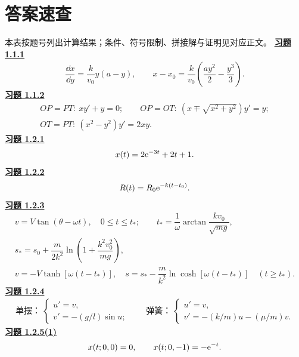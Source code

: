 \section{答案速查}
\noindent 本表按题号列出计算结果；条件、符号限制、拼接解与证明见对应正文。
\begingroup\small
\noindent\textbf{\hyperref[q:1.1.1]{习题 1.1.1}}
\[\begin{gathered}\dfrac{\dd x}{\dd y}=\dfrac{k}{v_0}y(a-y),\qquad
x-x_0=\dfrac{k}{v_0}\left(\dfrac{ay^2}{2}-\dfrac{y^3}{3}\right).\end{gathered}\]
\noindent\textbf{\hyperref[q:1.1.2]{习题 1.1.2}}
\[\begin{gathered}OP=PT:\ xy'+y=0;\qquad OP=OT:\ (x\mp\sqrt{x^2+y^2})y'=y;\\
OT=PT:\ (x^2-y^2)y'=2xy.\end{gathered}\]
\noindent\textbf{\hyperref[q:1.2.1]{习题 1.2.1}}
\[\begin{gathered}x(t)=2\mathrm e^{-3t}+2t+1.\end{gathered}\]
\noindent\textbf{\hyperref[q:1.2.2]{习题 1.2.2}}
\[\begin{gathered}R(t)=R_0\mathrm e^{-k(t-t_0)}.\end{gathered}\]
\noindent\textbf{\hyperref[q:1.2.3]{习题 1.2.3}}
\[\begin{gathered}v=V\tan(\theta-\omega t),\quad 0\le t\le t_*;\qquad t_*=\dfrac1\omega\arctan\dfrac{kv_0}{\sqrt{mg}},\\
s_*=s_0+\dfrac m{2k^2}\ln\left(1+\dfrac{k^2v_0^2}{mg}\right),\\
v=-V\tanh[\omega(t-t_*)],\quad
s=s_*-\dfrac m{k^2}\ln\cosh[\omega(t-t_*)]\quad(t\ge t_*).\end{gathered}\]
\noindent\textbf{\hyperref[q:1.2.4]{习题 1.2.4}}
\[\begin{gathered}\text{单摆：}\ \begin{cases}u'=v,\\v'=-(g/l)\sin u;\end{cases}\qquad
\text{弹簧：}\ \begin{cases}u'=v,\\v'=-(k/m)u-(\mu/m)v.\end{cases}\end{gathered}\]
\noindent\textbf{\hyperref[q:1.2.5(1)]{习题 1.2.5(1)}}
\[\begin{gathered}x(t;0,0)=0,\qquad x(t;0,-1)=-\mathrm e^{-t}.\end{gathered}\]
